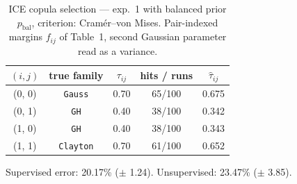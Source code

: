 \begin{table}[htbp]
  \centering
  \caption{ICE copula selection — exp.\ 1 with balanced prior $p_{\text{bal}}$, criterion: Cram\'er--von Mises. Pair-indexed margins $f_{ij}$ of Table~1, second Gaussian parameter read as a variance.}
  \label{tab:exp3-exp1_bal_p__cvm}
  \begin{tabular}{ccccc}
    \toprule
    $(i, j)$ & true family & $\tau_{ij}$ & hits / runs & $\hat\tau_{ij}$ \\
    \midrule
    (0, 0) & \texttt{Gauss} & 0.70 & 65/100 & 0.675 \\
    (0, 1) & \texttt{GH} & 0.40 & 38/100 & 0.342 \\
    (1, 0) & \texttt{GH} & 0.40 & 38/100 & 0.343 \\
    (1, 1) & \texttt{Clayton} & 0.70 & 61/100 & 0.652 \\
    \bottomrule
  \end{tabular}
  \par\smallskip Supervised error: 20.17\% ($\pm$ 1.24). Unsupervised: 23.47\% ($\pm$ 3.85).
\end{table}
